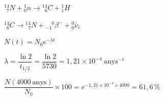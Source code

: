 \begin{solapartat}
 ${}^{14}_{\phantom{1}7}N + {}^{1}_{0}n \rightarrow {}^{14}_{\phantom{1}6}C + {}^{1}_{1}H$

\smallskip
{} ${}^{14}_{\phantom{1}6}C \rightarrow {}^{14}_{\phantom{1}7}N + {}^{\phantom{-}0}_{-1}\beta^- + {}^{0}_{0}\bar{\nu}_e$
\end{solapartat}

\begin{solapartat}
 $N(t) = N_0 e^{-\lambda t}$

\smallskip
{} $\lambda = \dfrac{\ln 2}{t_{1/2}} = \dfrac{\ln 2}{5730} = 1,21\times 10^{-4}\ \mathrm{anys^{-1}}$

\smallskip
{} $\dfrac{N(4000\ \mathrm{anys})}{N_0}\times 100 = e^{-1,21\times 10^{-4}\times 4000} = 61,6\,\%$ \quad{}
\end{solapartat}
